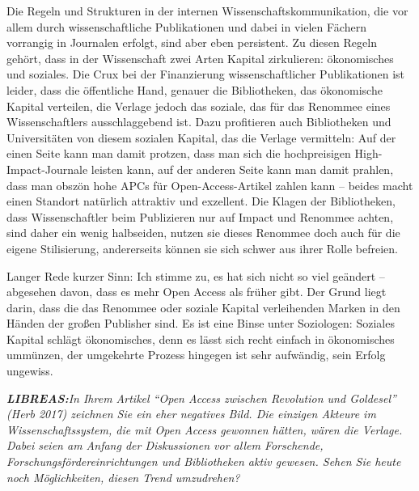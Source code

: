 \documentclass[a4paper,
fontsize=11pt,
oneside,
numbers=noperiodatend,
parskip=half-,
bibliography=totoc,
final
]{scrartcl}
\begin{document}
Die Regeln und Strukturen in der internen Wissenschaftskommunikation,
die vor allem durch wissenschaftliche Publikationen und dabei in vielen
Fächern vorrangig in Journalen erfolgt, sind aber eben persistent. Zu
diesen Regeln gehört, dass in der Wissenschaft zwei Arten Kapital
zirkulieren: ökonomisches und soziales. Die Crux bei der Finanzierung
wissenschaftlicher Publikationen ist leider, dass die öffentliche Hand,
genauer die Bibliotheken, das ökonomische Kapital verteilen, die Verlage
jedoch das soziale, das für das Renommee eines Wissenschaftlers
ausschlaggebend ist. Dazu profitieren auch Bibliotheken und
Universitäten von diesem sozialen Kapital, das die Verlage vermitteln:
Auf der einen Seite kann man damit protzen, dass man sich die
hochpreisigen High-Impact-Journale leisten kann, auf der anderen Seite
kann man damit prahlen, dass man obszön hohe APCs für
Open-Access-Artikel zahlen kann -- beides macht einen Standort natürlich
attraktiv und exzellent. Die Klagen der Bibliotheken, dass
Wissenschaftler beim Publizieren nur auf Impact und Renommee achten,
sind daher ein wenig halbseiden, nutzen sie dieses Renommee doch auch
für die eigene Stilisierung, andererseits können sie sich schwer aus
ihrer Rolle befreien.

Langer Rede kurzer Sinn: Ich stimme zu, es hat sich nicht so viel
geändert -- abgesehen davon, dass es mehr Open Access als früher gibt.
Der Grund liegt darin, dass die das Renommee oder soziale Kapital
verleihenden Marken in den Händen der großen Publisher sind. Es ist eine
Binse unter Soziologen: Soziales Kapital schlägt ökonomisches, denn es
lässt sich recht einfach in ökonomisches ummünzen, der umgekehrte
Prozess hingegen ist sehr aufwändig, sein Erfolg ungewiss.

\emph{\textbf{LIBREAS:}In Ihrem Artikel \enquote{Open Access zwischen
Revolution und Goldesel} (Herb 2017) zeichnen Sie ein eher negatives
Bild. Die einzigen Akteure im Wissenschaftssystem, die mit Open Access
gewonnen hätten, wären die Verlage. Dabei seien am Anfang der
Diskussionen vor allem Forschende, Forschungsfördereinrichtungen und
Bibliotheken aktiv gewesen. Sehen Sie heute noch Möglichkeiten, diesen
Trend umzudrehen?}
\end{document}
